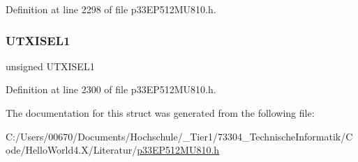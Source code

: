 Definition at line 2298 of file p33\+E\+P512\+M\+U810.\+h.

\mbox{\label{structtag_u4_s_t_a_b_i_t_s_af7ce0d24148cffc8fc3d8abccf37ea9f}} 
\subsubsection{\texorpdfstring{U\+T\+X\+I\+S\+E\+L1}{UTXISEL1}}
{\footnotesize\ttfamily unsigned U\+T\+X\+I\+S\+E\+L1}



Definition at line 2300 of file p33\+E\+P512\+M\+U810.\+h.



The documentation for this struct was generated from the following file\+:\begin{DoxyCompactItemize}
\item 
C\+:/\+Users/00670/\+Documents/\+Hochschule/\+\_\+\+Tier1/73304\+\_\+\+Technische\+Informatik/\+Code/\+Hello\+World4.\+X/\+Literatur/\hyperlink{p33_e_p512_m_u810_8h}{p33\+E\+P512\+M\+U810.\+h}\end{DoxyCompactItemize}
